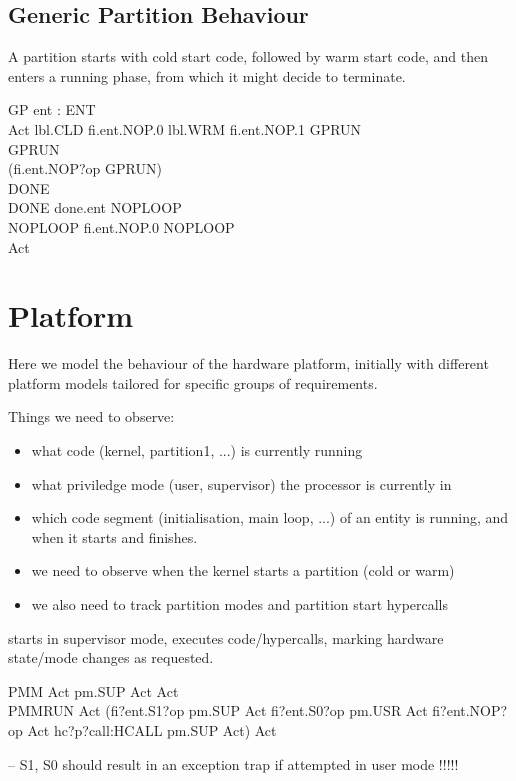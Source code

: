 \subsection{Generic Partition Behaviour}

A partition starts with cold start code, followed by warm start code,
and then enters a running phase, from which it might decide to terminate.

\begin{circus}
\circprocess GP \circdef ent : ENT \circspot \circbegin\\
  Act \circdef lbl.CLD \then  fi.ent.NOP.0 \then  lbl.WRM \then  fi.ent.NOP.1 \then  GPRUN\\
GPRUN\circdef\\
  (fi.ent.NOP?op \then  GPRUN)\\
   \intchoice DONE\\
   DONE \circdef done.ent \then  NOPLOOP\\
   NOPLOOP \circdef fi.ent.NOP.0 \then  NOPLOOP   \\
   \circspot Act\\
\circend

\end{circus}


\section{Platform}

 Here we model the behaviour of the hardware platform, initially with different
 platform models tailored for specific groups of requirements.

Things we need to observe:
  \begin{itemize}
    \item
      what code (kernel, partition1, ...) is currently running
    \item
      what priviledge mode (user, supervisor) the processor is currently in
    \item
      which code segment (initialisation, main loop, ...) of an entity is running,
        and when it starts and finishes.
    \item
      we need to observe when the kernel starts a partition (cold or warm)
    \item
      we also need to track partition modes and partition start hypercalls
  \end{itemize}

starts in supervisor mode, executes code/hypercalls,
marking hardware state/mode changes as requested.
\begin{circus}
\circprocess PMM \circdef \circbegin Act \circdef pm.SUP \then Act \circspot Act \circend\\

\circprocess PMMRUN \circdef
\circbegin
  Act \circdef (fi?ent.S1?op \then pm.SUP \then Act
   \extchoice
   fi?ent.S0?op \then pm.USR \then Act
   \extchoice
   fi?ent.NOP?op \then Act
   \extchoice
   hc?p?call:HCALL \then pm.SUP \then Act)
   \circspot Act
\circend
\end{circus}
-- S1, S0 should result in an exception trap if attempted in user mode !!!!!

